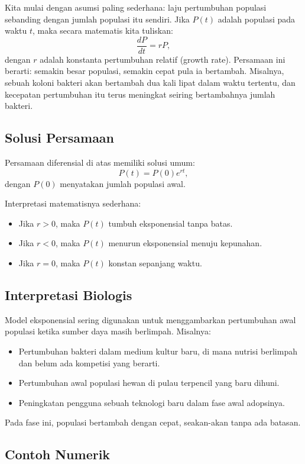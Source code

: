 \documentclass{bukumjh}
\begin{document}
Kita mulai dengan asumsi paling sederhana: laju pertumbuhan populasi sebanding dengan jumlah populasi itu sendiri. Jika $P(t)$ adalah populasi pada waktu $t$, maka secara matematis kita tuliskan:
\[
\frac{dP}{dt} = rP,
\]
dengan $r$ adalah konstanta pertumbuhan relatif (growth rate). Persamaan ini berarti: semakin besar populasi, semakin cepat pula ia bertambah. Misalnya, sebuah koloni bakteri akan bertambah dua kali lipat dalam waktu tertentu, dan kecepatan pertumbuhan itu terus meningkat seiring bertambahnya jumlah bakteri.

\subsection*{Solusi Persamaan}

Persamaan diferensial di atas memiliki solusi umum:
\[
P(t) = P(0) e^{rt},
\]
dengan $P(0)$ menyatakan jumlah populasi awal.

Interpretasi matematisnya sederhana:
\begin{itemize}
    \item Jika $r > 0$, maka $P(t)$ tumbuh eksponensial tanpa batas.
    \item Jika $r < 0$, maka $P(t)$ menurun eksponensial menuju kepunahan.
    \item Jika $r = 0$, maka $P(t)$ konstan sepanjang waktu.
\end{itemize}

\subsection*{Interpretasi Biologis}

Model eksponensial sering digunakan untuk menggambarkan pertumbuhan awal populasi ketika sumber daya masih berlimpah. Misalnya:
\begin{itemize}
    \item Pertumbuhan bakteri dalam medium kultur baru, di mana nutrisi berlimpah dan belum ada kompetisi yang berarti.
    \item Pertumbuhan awal populasi hewan di pulau terpencil yang baru dihuni.
    \item Peningkatan pengguna sebuah teknologi baru dalam fase awal adopsinya.
\end{itemize}

Pada fase ini, populasi bertambah dengan cepat, seakan-akan tanpa ada batasan.

\subsection*{Contoh Numerik}
\end{document}

